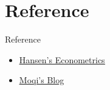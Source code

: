 \documentclass[
  9pt,
  ignorenonframetext,
  compress]{beamer}
\begin{document}
\hypertarget{reference}{%
\section{Reference}\label{reference}}

\begin{frame}{Reference}
\begin{itemize}
\item
  \href{https://www.ssc.wisc.edu/~bhansen/econometrics/Econometrics.pdf}{\underline{Hansen's Econometrics}}
\item
  \href{https://www.moqixu.com/faq/faq-how-to-have-a-better-meeting-with-your-phd-supervisor}{\underline{Moqi's Blog}}
\end{itemize}
\end{frame}
\end{document}
